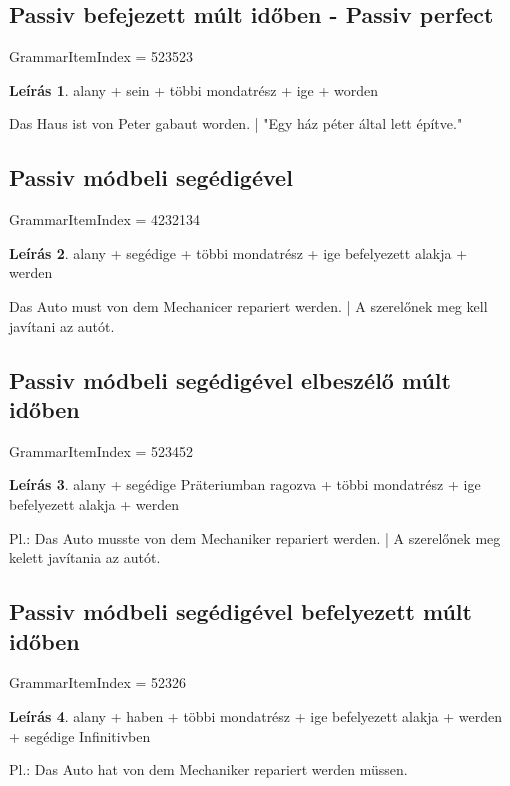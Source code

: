 \documentclass{article}
\theoremstyle{definition}
\newtheorem*{desc}{Leírás}
\begin{document}
\subsection{Passiv befejezett múlt időben - Passiv perfect}

GrammarItemIndex = 523523

\begin{desc}
alany + sein + többi mondatrész + ige + worden

Das Haus ist von Peter gabaut worden. | "Egy ház péter által lett építve."
\end{desc}

\subsection{Passiv módbeli segédigével}

GrammarItemIndex = 4232134

\begin{desc}
alany + segédige + többi mondatrész + ige befelyezett alakja + werden

Das Auto must von dem Mechanicer repariert werden. | A szerelőnek meg kell javítani az autót.
\end{desc}

\subsection{Passiv módbeli segédigével elbeszélő múlt időben}

GrammarItemIndex = 523452

\begin{desc}
alany + segédige Präteriumban ragozva + többi mondatrész + ige befelyezett alakja + werden

Pl.: Das Auto musste von dem Mechaniker repariert werden. | A szerelőnek meg kelett javítania az autót.
\end{desc}

\subsection{Passiv módbeli segédigével befelyezett múlt időben}

GrammarItemIndex = 52326

\begin{desc}
alany + haben + többi mondatrész + ige befelyezett alakja + werden + segédige Infinitivben

Pl.: Das Auto hat von dem Mechaniker repariert werden müssen.
\end{desc}
\end{document}
